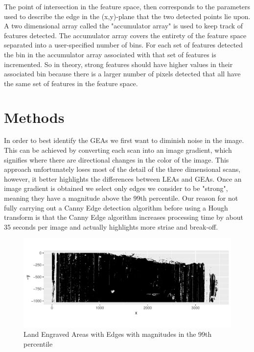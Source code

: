 \documentclass[12pt]{article}\usepackage[]{graphicx}\usepackage[]{color}
\makeatletter
\def\maxwidth{ %
  \ifdim\Gin@nat@width>\linewidth
    \linewidth
  \else
    \Gin@nat@width
  \fi
}
\newenvironment{knitrout}{}{} %
\theoremstyle{nonumberplain}
\makeatother
\begin{document}
The point of intersection in the feature space, then corresponds to the parameters used to describe the edge in the (x,y)-plane that the two detected points lie upon. A two dimensional array called the "accumulator array" is used to keep track of features detected.  The accumulator array covers the entirety of the feature space separated into a user-specified number of bins. For each set of features detected the bin in the accumulator array associated with that set of features is incremented. So in theory, strong features should have higher values in their associated bin because there is a larger number of pixels detected that all have the same set of features in the feature space. 


\section{Methods}


In order to best identify the GEAs we first want to diminish noise in the image. This can be achieved by converting each scan into an image gradient, which signifies where there are directional changes in the color of the image. This approach unfortunately loses most of the detail of the three dimensional scans, however, it better highlights the differences between LEAs and GEAs. Once an image gradient is obtained we select only edges we consider to be "strong", meaning they have a magnitude above the 99th percentile. Our reason for not fully carrying out a Canny Edge detection algorithm before using a Hough transform is that the Canny Edge algorithm increases processing time by about 35 seconds per image and actually highlights more striae and break-off. 

\begin{knitrout}
\color{fgcolor}\begin{figure}

{\centering \includegraphics[width=\maxwidth]{figure/r_strong-edge-1} 

}

\caption[Land Engraved Areas with Edges with magnitudes in the 99th percentile]{Land Engraved Areas with Edges with magnitudes in the 99th percentile}\label{fig:r strong-edge}
\end{figure}


\end{knitrout}
\end{document}
